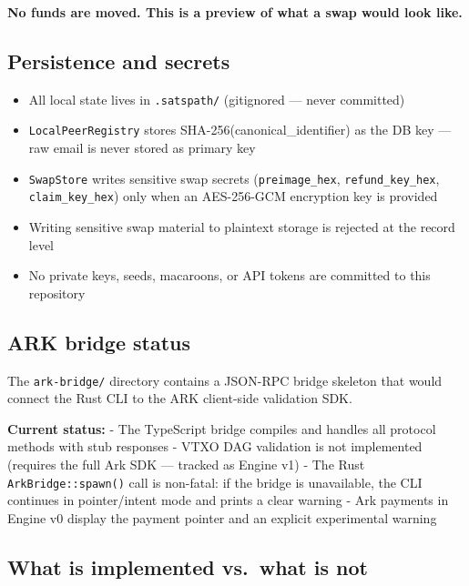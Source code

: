 \documentclass[
]{article}
\providecommand{\tightlist}{%
  \setlength{\itemsep}{0pt}\setlength{\parskip}{0pt}}
\begin{document}
\textbf{No funds are moved. This is a preview of what a swap would look
like.}

\hypertarget{persistence-and-secrets}{%
\subsection{Persistence and secrets}\label{persistence-and-secrets}}

\begin{itemize}
\tightlist
\item
  All local state lives in \texttt{.satspath/} (gitignored --- never
  committed)
\item
  \texttt{LocalPeerRegistry} stores SHA-256(canonical\_identifier) as
  the DB key --- raw email is never stored as primary key
\item
  \texttt{SwapStore} writes sensitive swap secrets
  (\texttt{preimage\_hex}, \texttt{refund\_key\_hex},
  \texttt{claim\_key\_hex}) only when an AES-256-GCM encryption key is
  provided
\item
  Writing sensitive swap material to plaintext storage is rejected at
  the record level
\item
  No private keys, seeds, macaroons, or API tokens are committed to this
  repository
\end{itemize}

\hypertarget{ark-bridge-status}{%
\subsection{ARK bridge status}\label{ark-bridge-status}}

The \texttt{ark-bridge/} directory contains a JSON-RPC bridge skeleton
that would connect the Rust CLI to the ARK client-side validation SDK.

\textbf{Current status:} - The TypeScript bridge compiles and handles
all protocol methods with stub responses - VTXO DAG validation is not
implemented (requires the full Ark SDK --- tracked as Engine v1) - The
Rust \texttt{ArkBridge::spawn()} call is non-fatal: if the bridge is
unavailable, the CLI continues in pointer/intent mode and prints a clear
warning - Ark payments in Engine v0 display the payment pointer and an
explicit experimental warning

\hypertarget{what-is-implemented-vs.-what-is-not}{%
\subsection{What is implemented vs.~what is
not}\label{what-is-implemented-vs.-what-is-not}}
\end{document}
